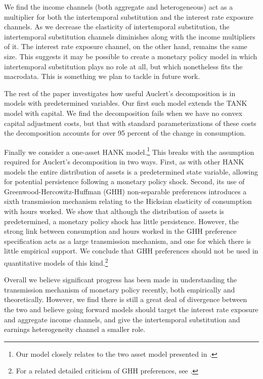\documentclass[12pt,a4paper]{article}
\begin{document}
We find the income channels (both aggregate and heterogeneous) act as a multiplier for both the intertemporal substitution and the interest rate exposure channels. As we decrease the elasticity of intertemporal substitution, the intertemporal substitution channels diminishes along with the income multipliers of it. The interest rate exposure channel, on the other hand, remains the same size. This suggests it may be possible to create a monetary policy model in which intertemporal substitution plays no role at all, but which nonetheless fits the macrodata. This is something we plan to tackle in future work.

The rest of the paper investigates how useful Auclert's decomposition is in models with predetermined variables. Our first such model extends the  TANK model with capital. We find the decomposition fails when we have no convex capital adjustment costs, but that with standard parameterizations of these costs the decomposition accounts for over 95 percent of the change in consumption.

Finally we consider a one-asset HANK model.\footnote{Our model closely relates to the two asset model presented in \cite{blSolving}.} This breaks with the assumption required for Auclert's decomposition in two ways. First, as with other HANK models the entire distribution of assets is a predetermined state variable, allowing for potential persistence following a monetary policy shock. Second, its use of Greenwood-Hercowitz-Huffman (GHH) non-separable preferences introduces a sixth transmission mechanism relating to the Hicksian elasticity of consumption with hours worked. We show that although the distribution of assets is predetermined, a monetary policy shock has little persistence. However, the strong link between consumption and hours worked in the GHH preference specification acts as a large transmission mechanism, and one for which there is little empirical support. We conclude that GHH preferences should not be used in quantitative models of this kind.\footnote{For a related detailed criticism of GHH preferences, see \cite{arGHH}.}

Overall we believe significant progress has been made in understanding the transmission mechanism of monetary policy recently, both empirically and theoretically. However, we find there is still a great deal of divergence between the two and believe going forward models should target the interest rate exposure and aggregate income channels, and give the intertemporal substitution and earnings heterogeneity channel a smaller role.
\end{document}
